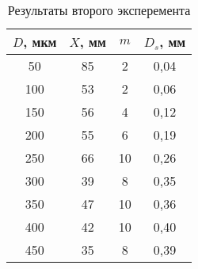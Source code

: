 \begin{table}[]
    \centering
    \begin{tabular}{|c|c|c|c|}
    \hline
    $D$, мкм   & $X$, мм  & $m$  & $D_s$, мм   \\ \hline
    50         & 85       & 2   & 0,04         \\ \hline
    100        & 53       & 2   & 0,06         \\ \hline
    150        & 56       & 4   & 0,12         \\ \hline
    200        & 55       & 6   & 0,19         \\ \hline
    250        & 66       & 10  & 0,26         \\ \hline
    300        & 39       & 8   & 0,35         \\ \hline
    350        & 47       & 10  & 0,36         \\ \hline
    400        & 42       & 10  & 0,40         \\ \hline
    450        & 35       & 8   & 0,39         \\ \hline
    \end{tabular}
    \caption{Результаты второго эксперемента}
    \label{table:DsSpectr}
\end{table}